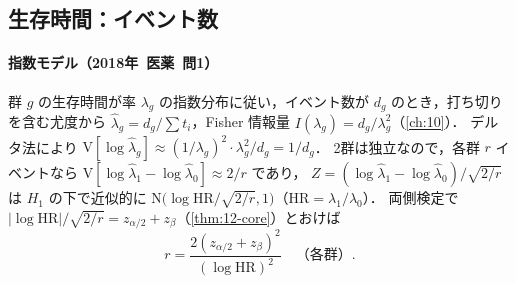 \documentclass[a4paper,11pt,openany]{ltjsbook}
\newcommand{\tagbox}[2]{\tcbox[on line,boxsep=0.5pt,left=2pt,right=2pt,top=0.5pt,bottom=0.5pt,
  colframe=#1,colback=#1!10,boxrule=0.4pt,arc=1pt]{\scriptsize\bfseries\textcolor{#1}{#2}}}
\newcommand{\Hinshutsu}{\tagbox{bkorange}{頻出}}
\newcommand{\kakomon}[2]{\mbox{#1年 医薬 問#2}}
\newcommand{\V}{\mathrm{V}}
\newcommand{\HR}{\mathrm{HR}}
\newcommand{\Normal}{\mathrm{N}}
\begin{document}
\subsection{生存時間：イベント数}\label{subsec:12-events}
\Hinshutsu
\paragraph{指数モデル（\kakomon{2018}{1}）}
群 $g$ の生存時間が率 $\lambda_g$ の指数分布に従い，イベント数が $d_g$ のとき，打ち切りを含む尤度から $\hat\lambda_g=d_g/\sum t_i$，Fisher 情報量 $I(\lambda_g)=d_g/\lambda_g^2$（\cref{ch:10}）．
デルタ法により $\V[\log\hat\lambda_g]\approx(1/\lambda_g)^2\cdot\lambda_g^2/d_g=1/d_g$．
2群は独立なので，各群 $r$ イベントなら $\V[\log\hat\lambda_1-\log\hat\lambda_0]\approx2/r$ であり，
$Z=(\log\hat\lambda_1-\log\hat\lambda_0)/\sqrt{2/r}$ は $H_1$ の下で近似的に $\Normal\bigl(\log\HR/\sqrt{2/r},1\bigr)$（$\HR=\lambda_1/\lambda_0$）．
両側検定で $|\log\HR|/\sqrt{2/r}=z_{\alpha/2}+z_\beta$（\cref{thm:12-core}）とおけば
\begin{equation}
r=\frac{2(z_{\alpha/2}+z_\beta)^2}{(\log\HR)^2}\quad\text{（各群）}.\label{eq:12-exp}
\end{equation}
\end{document}
